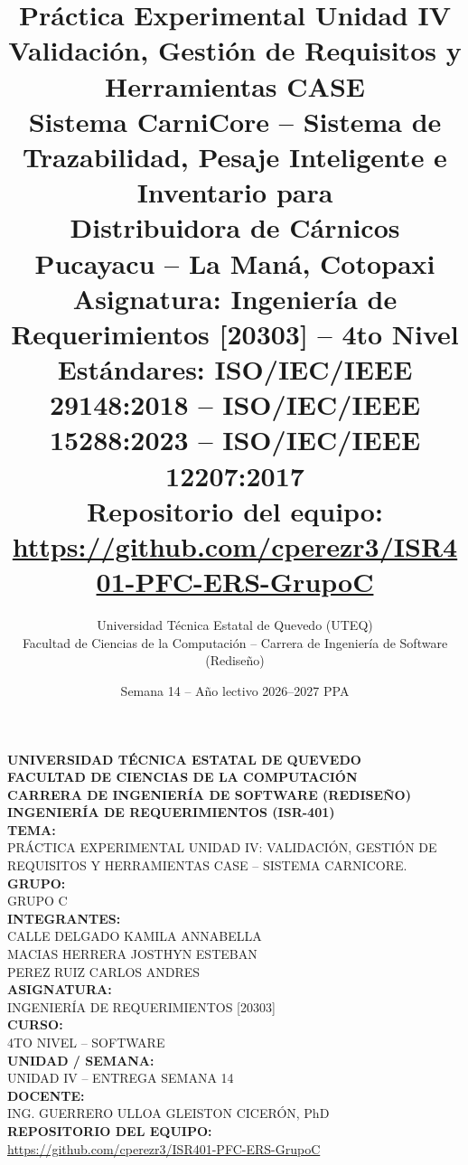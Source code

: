 \documentclass[11pt,a4paper]{article}
\title{
\vspace{-2cm}
\textbf{Práctica Experimental Unidad IV}\\[0.3cm]
\Large Validación, Gestión de Requisitos y Herramientas CASE\\[0.2cm]
\large Sistema CarniCore -- Sistema de Trazabilidad, Pesaje Inteligente e Inventario para\\
Distribuidora de Cárnicos Pucayacu -- La Maná, Cotopaxi\\[0.4cm]
\normalsize Asignatura: Ingeniería de Requerimientos [20303] -- 4to Nivel\\
Estándares: ISO/IEC/IEEE 29148:2018 -- ISO/IEC/IEEE 15288:2023 -- ISO/IEC/IEEE 12207:2017\\
Repositorio del equipo: \url{https://github.com/cperezr3/ISR401-PFC-ERS-GrupoC}
}
\author{Universidad Técnica Estatal de Quevedo (UTEQ)\\Facultad de Ciencias de la Computación -- Carrera de Ingeniería de Software (Rediseño)}
\date{Semana 14 -- Año lectivo 2026--2027 PPA}
\begin{document}
\begin{titlepage}
    \centering

    \textbf{\large UNIVERSIDAD TÉCNICA ESTATAL DE QUEVEDO}\\[0.5cm]

    \textbf{FACULTAD DE CIENCIAS DE LA COMPUTACIÓN}\\
    \textbf{CARRERA DE INGENIERÍA DE SOFTWARE (REDISEÑO)}\\[0.8cm]

    \textbf{INGENIERÍA DE REQUERIMIENTOS (ISR-401)}\\[0.5cm]

    \textbf{TEMA:}\\[0.3cm]

    PRÁCTICA EXPERIMENTAL UNIDAD IV: VALIDACIÓN, GESTIÓN DE REQUISITOS Y HERRAMIENTAS CASE -- SISTEMA CARNICORE.\\[0.5cm]

    \textbf{GRUPO:}\\[0.3cm]
    GRUPO C\\[0.5cm]

    \textbf{INTEGRANTES:}\\[0.5cm]
    CALLE DELGADO KAMILA ANNABELLA\\[0.3cm]
    MACIAS HERRERA JOSTHYN ESTEBAN\\[0.3cm]
    PEREZ RUIZ CARLOS ANDRES\\[0.5cm]

    \textbf{ASIGNATURA:}\\[0.3cm]
    INGENIERÍA DE REQUERIMIENTOS [20303]\\[0.3cm]

    \textbf{CURSO:}\\[0.3cm]
    4TO NIVEL -- SOFTWARE\\[0.3cm]

    \textbf{UNIDAD / SEMANA:}\\[0.3cm]
    UNIDAD IV -- ENTREGA SEMANA 14\\[0.3cm]

    \textbf{DOCENTE:}\\[0.3cm]
    ING. GUERRERO ULLOA GLEISTON CICERÓN, PhD\\[0.5cm]

    \textbf{REPOSITORIO DEL EQUIPO:}\\[0.2cm]
    \url{https://github.com/cperezr3/ISR401-PFC-ERS-GrupoC}\\[0.5cm]

    \vfill

\end{titlepage}
\end{document}
